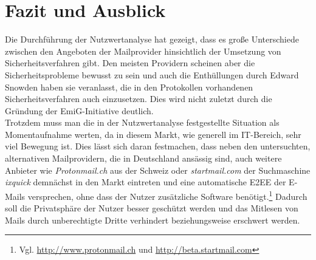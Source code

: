 \documentclass  [paper=a4,
				fontsize=12pt,
				listof=totoc,
				bibliography=totoc
				]{scrreprt}
\begin{document}
%			
%			
%			
				
			
	\chapter{Fazit und Ausblick}
		\color{black}
		Die Durchführung der Nutzwertanalyse hat gezeigt, dass es große Unterschiede zwischen den Angeboten der Mailprovider hinsichtlich der Umsetzung von Sicherheitsverfahren gibt.
		Den meisten Providern scheinen aber die Sicherheitsprobleme bewusst zu sein und auch die Enthüllungen durch Edward Snowden haben sie veranlasst, die in den Protokollen vorhandenen Sicherheitsverfahren auch einzusetzen.
		Dies wird nicht zuletzt durch die Gründung der \ac{EmiG}-Initiative deutlich.\medskip\\
		
		Trotzdem muss man die in der Nutzwertanalyse festgestellte Situation als Momentaufnahme werten, da in diesem Markt, wie generell im IT-Bereich, sehr viel Bewegung ist.
		Dies lässt sich daran festmachen, dass neben den untersuchten, alternativen Mailprovidern, die in Deutschland ansässig sind, auch weitere Anbieter wie \textit{Protonmail.ch} aus der Schweiz oder \textit{startmail.com} der Suchmaschine \textit{ixquick} demnächst in den Markt eintreten und eine automatische \ac{E2EE} der E-Mails versprechen, ohne dass der Nutzer zusätzliche Software benötigt.\footnote{Vgl. \url{http://www.protonmail.ch} und \url{http://beta.startmail.com}}
		Dadurch soll die Privatsphäre der Nutzer besser geschützt werden und das Mitlesen von Mails durch unberechtigte Dritte verhindert beziehungsweise erschwert werden.\medskip\\
		
\end{document}
